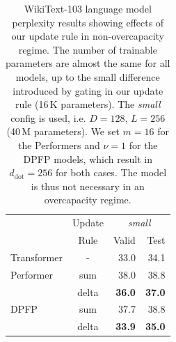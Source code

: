 \documentclass{article}
\theoremstyle{definition}
\begin{document}
\begin{table}[h]
\caption{WikiText-103 language model perplexity results
showing effects of our update rule
in non-overcapacity regime.
The number of trainable parameters are almost the same for all models,
up to the small difference introduced by gating in our update rule (16\,K parameters).
The \textit{small} config is used, i.e. $D=128$, $L=256$ (40\,M parameters).
We set $m=16$ for the Performers and $\nu=1$ for the DPFP models,
which result in $d_\text{dot} = 256$ for both cases.
The model is thus not necessary in an overcapacity regime.  
}
\label{tab:lm_non_overcap}
\vskip 0.15in
\begin{center}
\begin{small}
\begin{tabular}{l|c|rr}
\toprule
     &  Update  & \multicolumn{2}{c}{\textit{small}}  \\
          &  Rule  & \multicolumn{1}{r}{Valid} & \multicolumn{1}{r}{Test}  \\ \midrule
Transformer   &   -      &  33.0  &  34.1 \\ \midrule
Performer &   sum    & 38.0   & 38.8 \\
          &  delta    & \textbf{36.0}  &  \textbf{37.0} \\ \midrule
DPFP &   sum    &  37.7  & 38.8   \\
          &  delta    &  \textbf{33.9}  & \textbf{35.0}  \\
\bottomrule
\end{tabular}
\end{small}
\end{center}
\vskip -0.1in


\end{table}
\end{document}
